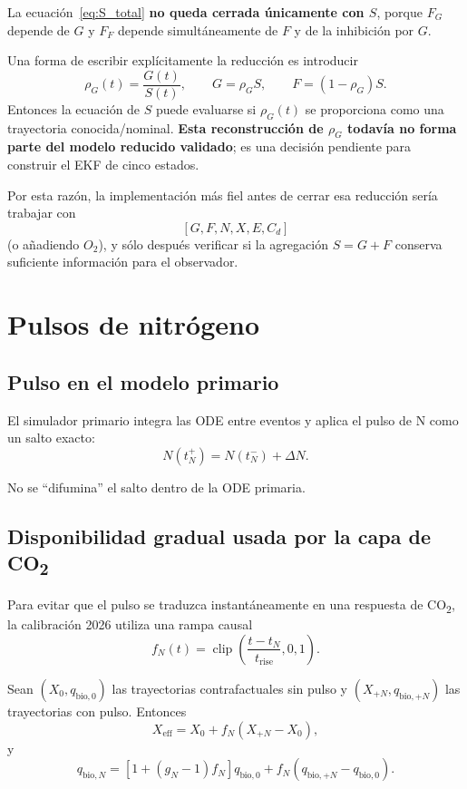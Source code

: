 \documentclass[11pt,a4paper]{article}
\newcommand{\clip}{\operatorname{clip}}
\begin{document}
La ecuación~\eqref{eq:S_total} \textbf{no queda cerrada únicamente con $S$}, porque
$F_G$ depende de $G$ y $F_F$ depende simultáneamente de $F$ y de la inhibición por $G$.

Una forma de escribir explícitamente la reducción es introducir
\[
\rho_G(t)=\frac{G(t)}{S(t)},
\qquad
G=\rho_GS,
\qquad
F=(1-\rho_G)S.
\]
Entonces la ecuación de $S$ puede evaluarse si $\rho_G(t)$ se proporciona como una trayectoria
conocida/nominal. \textbf{Esta reconstrucción de $\rho_G$ todavía no forma parte del modelo
reducido validado}; es una decisión pendiente para construir el EKF de cinco estados.

Por esta razón, la implementación más fiel antes de cerrar esa reducción sería trabajar con
\[
[G,F,N,X,E,C_d]
\]
(o añadiendo $O_2$), y sólo después verificar si la agregación $S=G+F$ conserva suficiente
información para el observador.

\section{Pulsos de nitrógeno}

\subsection{Pulso en el modelo primario}

El simulador primario integra las ODE entre eventos y aplica el pulso de N como un salto exacto:
\begin{equation}
\boxed{
N(t_N^+)=N(t_N^-)+\Delta N.
}
\label{eq:N_jump}
\end{equation}

No se ``difumina'' el salto dentro de la ODE primaria.

\subsection{Disponibilidad gradual usada por la capa de CO\textsubscript{2}}

Para evitar que el pulso se traduzca instantáneamente en una respuesta de CO\textsubscript{2}, la
calibración 2026 utiliza una rampa causal
\begin{equation}
f_N(t)=
\clip\left(
\frac{t-t_N}{t_{\mathrm{rise}}},
0,1
\right).
\label{eq:pulse_fraction}
\end{equation}

Sean $(X_0,q_{\mathrm{bio},0})$ las trayectorias contrafactuales sin pulso y
$(X_{+N},q_{\mathrm{bio},+N})$ las trayectorias con pulso. Entonces
\begin{equation}
X_{\mathrm{eff}}
=
X_0+
f_N
\left(
X_{+N}-X_0
\right),
\label{eq:Xeff}
\end{equation}
y
\begin{equation}
q_{\mathrm{bio},N}
=
\left[
1+(g_N-1)f_N
\right]q_{\mathrm{bio},0}
+
f_N
\left(
q_{\mathrm{bio},+N}-q_{\mathrm{bio},0}
\right).
\label{eq:qbioN}
\end{equation}
\end{document}
